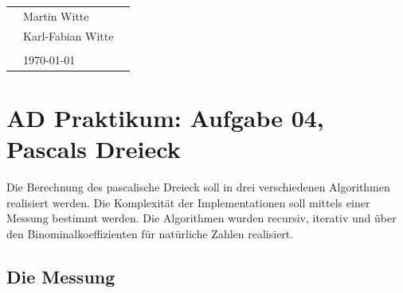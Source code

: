 \documentclass[
   draft=false
  ,paper=a4
  ,twoside=false
  ,fontsize=11pt
  ,headsepline
  ,DIV11
  ,parskip=full+
]{scrartcl} %
\begin{document}
\def\titel{AD Praktikum: Aufgabe 04, Pascals Dreieck}


\def\teilnehmer{ 
	& Martin Witte & \\
    & Karl-Fabian Witte   & \\
}




\newlength{\txtw} %
\setlength{\txtw}{\textwidth} %
\addtolength{\txtw}{-10\tabcolsep} %

\def\me{\myName \newline \footnotesize{\url{\myEmail} } }

\begin{tabular}{l p{0.4\txtw} p{0.4\txtw} }
	\teilnehmer
	& & \\
	& \today & \\
\end{tabular}

\section*{\titel}
\centering
Die Berechnung des pascalische Dreieck soll in drei verschiedenen Algorithmen realisiert werden. Die \mbox{Komplexität} der Implementationen soll mittels einer Messung bestimmt werden. Die Algorithmen wurden recursiv, iterativ und über den Binominalkoeffizienten für natürliche Zahlen realisiert.  

\normalsize

\flushleft
\subsection*{Die Messung}
	
\end{document}
